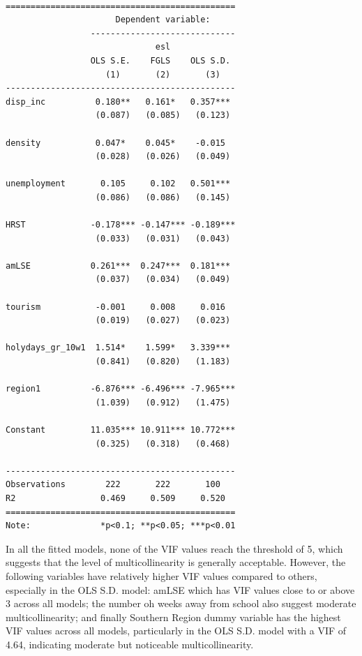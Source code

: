 \documentclass[
  letterpaper,
  DIV=11,
  numbers=noendperiod,
  abstract]{scrartcl}
\begin{document}
\begin{verbatim}

==============================================
                      Dependent variable:     
                 -----------------------------
                              esl             
                 OLS S.E.    FGLS    OLS S.D. 
                    (1)       (2)       (3)   
----------------------------------------------
disp_inc          0.180**   0.161*   0.357*** 
                  (0.087)   (0.085)   (0.123) 
                                              
density           0.047*    0.045*    -0.015  
                  (0.028)   (0.026)   (0.049) 
                                              
unemployment       0.105     0.102   0.501*** 
                  (0.086)   (0.086)   (0.145) 
                                              
HRST             -0.178*** -0.147*** -0.189***
                  (0.033)   (0.031)   (0.043) 
                                              
amLSE            0.261***  0.247***  0.181*** 
                  (0.037)   (0.034)   (0.049) 
                                              
tourism           -0.001     0.008     0.016  
                  (0.019)   (0.027)   (0.023) 
                                              
holydays_gr_10w1  1.514*    1.599*   3.339*** 
                  (0.841)   (0.820)   (1.183) 
                                              
region1          -6.876*** -6.496*** -7.965***
                  (1.039)   (0.912)   (1.475) 
                                              
Constant         11.035*** 10.911*** 10.772***
                  (0.325)   (0.318)   (0.468) 
                                              
----------------------------------------------
Observations        222       222       100   
R2                 0.469     0.509     0.520  
==============================================
Note:              *p<0.1; **p<0.05; ***p<0.01
\end{verbatim}

In all the fitted models, none of the VIF values reach the threshold of
5, which suggests that the level of multicollinearity is generally
acceptable. However, the following variables have relatively higher VIF
values compared to others, especially in the OLS S.D. model: amLSE which
has VIF values close to or above 3 across all models; the number oh
weeks away from school also suggest moderate multicollinearity; and
finally Southern Region dummy variable has the highest VIF values across
all models, particularly in the OLS S.D. model with a VIF of 4.64,
indicating moderate but noticeable multicollinearity.
\end{document}
